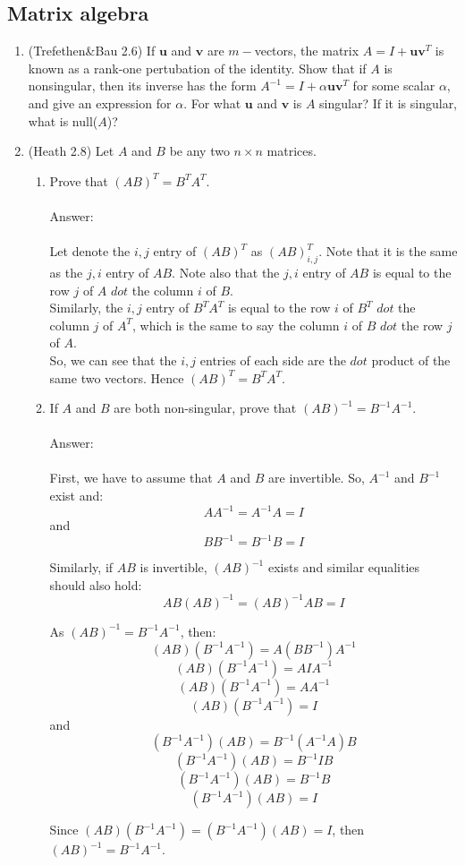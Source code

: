 \documentclass{article}
\renewcommand{\vec}[1]{\mathbf{#1}}
\begin{document}
\subsection*{Matrix algebra}
\begin{enumerate}
\setcounter{enumi}{0}
\item (Trefethen\&Bau 2.6) If $\vec{u}$ and $\vec{v}$ are $m-$vectors, the matrix $A = I+\vec{u}\vec{v}^T$ is known as a rank-one
  pertubation of the identity.  Show that if $A$ is nonsingular, then its inverse has the form $A^{-1} = I + \alpha
  \vec{u} \vec{v}^T$ for some scalar $\alpha$, and give an expression for $\alpha$.  For what $\vec{u}$ and $\vec{v}$ is
  $A$ singular?  If it is singular, what is null($A$)?
\item (Heath 2.8) Let $A$ and $B$ be any two $n \times n$ matrices.
\begin{enumerate}
\item Prove that $(AB)^T=B^TA^T$.\\
\\
Answer:\\
\\
Let denote the $i,j$ entry of $(AB)^T$ as $(AB)_{i,j}^T$.  Note that it is the same as the $j,i$ entry of $AB$. Note also that the $j,i$ entry of $AB$ is equal to the row $j$ of $A$ $dot$ the column $i$ of $B$.\\
Similarly, the $i,j$ entry of $B^TA^T$ is equal to the row $i$ of $B^T$ $dot$ the column $j$ of $A^T$, which is the same to say the column $i$ of $B$ $dot$ the row $j$ of $A$.\\
So, we can see that the $i,j$ entries of each side are the $dot$ product of the same two vectors.  Hence $(AB)^T=B^TA^T$.

\item If $A$ and $B$ are both non-singular, prove that $(AB)^{-1} = B^{-1}A^{-1}$.\\
\\
Answer:\\
\\
First, we have to assume that $A$ and $B$ are invertible.  So, $A^{-1}$ and $B^{-1}$ exist and:
$$AA^{-1}=A^{-1}A=I$$ and
$$BB^{-1}=B^{-1}B=I$$ 

Similarly, if $AB$ is invertible, $(AB)^{-1}$ exists and similar equalities should also hold:
$$AB(AB)^{-1}=(AB)^{-1}AB=I$$

As $(AB)^{-1} = B^{-1}A^{-1}$, then:
$$(AB)(B^{-1}A^{-1})=A(BB^{-1})A^{-1}$$
$$(AB)(B^{-1}A^{-1})=AIA^{-1}$$
$$(AB)(B^{-1}A^{-1})=AA^{-1}$$
$$(AB)(B^{-1}A^{-1})=I$$
and
$$(B^{-1}A^{-1})(AB)=B^{-1}(A^{-1}A)B$$
$$(B^{-1}A^{-1})(AB)=B^{-1}IB$$
$$(B^{-1}A^{-1})(AB)=B^{-1}B$$
$$(B^{-1}A^{-1})(AB)=I$$

Since $(AB)(B^{-1}A^{-1})=(B^{-1}A^{-1})(AB)=I$, then $(AB)^{-1} = B^{-1}A^{-1}$.

\end{enumerate}
\end{enumerate}
\end{document}
